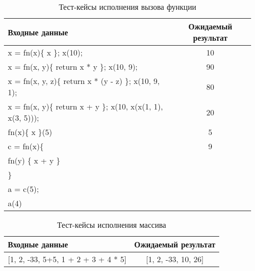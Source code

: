 \begin{table}[!ht]
    \Large
    \centering
    \begin{threeparttable}
        \caption{Тест-кейсы исполнения вызова функции}
        \label{t:testCases_fnCall}
        \begin{tabularx}{\textwidth}{|X|c|}
            \hline
            Входные данные                                              & Ожидаемый результат \\
            \hline
            x = fn(x)\{ x \}; x(10);                                    & 10                  \\
            \hline
            x = fn(x, y)\{ return x * y \}; x(10, 9);                   & 90                  \\
            \hline
            x = fn(x, y, z)\{ return x * (y - z) \}; x(10,   9, 1);     & 80                  \\
            \hline
            x = fn(x, y)\{ return x + y \}; x(10, x(x(1, 1), x(3, 5))); & 20                  \\
            \hline
            fn(x)\{ x \}(5)                                             & 5                   \\
            \hline
            c = fn(x)\{                                                 & 9                   \\
            fn(y) \{ x + y \}                                           &                     \\
            \}                                                          &                     \\
            a = c(5);                                                   &                     \\
            a(4)                                                        &                     \\
            \hline
        \end{tabularx}
    \end{threeparttable}
    \vspace{\bottompaddingoftable}
\end{table}


\begin{table}[!ht]
    \Large
    \centering
    \begin{threeparttable}
        \caption{Тест-кейсы исполнения массива}
        \label{t:testCases_arrayExprt}
        \begin{tabularx}{\textwidth}{|X|c|}
            \hline
            Входные данные          & Ожидаемый результат \\
            \hline
            {[}1, 2, -33, 5+5, 1 + 2 + 3 + 4 * 5{]}          & {[}1, 2, -33, 10, 26{]}         \\
            \hline
        \end{tabularx}
    \end{threeparttable}
    \vspace{\bottompaddingoftable}
\end{table}

